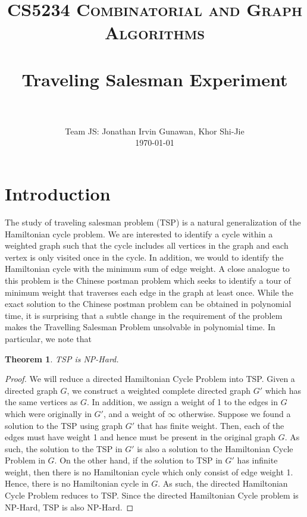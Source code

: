 \documentclass[paper=a4, fontsize=11pt]{scrartcl}	%
\title{
		\usefont{OT1}{bch}{b}{n}
		\normalfont \normalsize \textsc{CS5234 Combinatorial and Graph Algorithms} \\ [25pt]
		\horrule{0.5pt} \\[0.4cm]
		\huge Traveling Salesman Experiment \\
		\horrule{2pt} \\[0.5cm]
}
\author{
		\normalfont 								\normalsize
       Team JS: Jonathan Irvin Gunawan, Khor Shi-Jie\\[-3pt]		\normalsize
        \today
}
\date{}
\numberwithin{equation}{section}		%
\numberwithin{figure}{section}			%
\numberwithin{table}{section}				%
\newtheorem{theorem}{Theorem}
\begin{document}
\maketitle

\section{Introduction}
The study of traveling salesman problem (TSP) is a natural generalization of the Hamiltonian cycle problem. We are interested to identify a cycle within a weighted graph such that the cycle includes all vertices in the graph and each vertex is only visited once in the cycle. In addition, we would to identify the Hamiltonian cycle with the minimum sum of edge weight. A close analogue to this problem is the Chinese postman problem which seeks to identify a tour of minimum weight that traverses each edge in the graph at least once. While the exact solution to the Chinese postman problem can be obtained in polynomial time, it is surprising that a subtle change in the requirement of the problem makes the Travelling Salesman Problem unsolvable in polynomial time. In particular, we note that

\begin{theorem}
TSP is NP-Hard.
\end{theorem}

\begin{proof}
We will reduce a directed Hamiltonian Cycle Problem into TSP. Given a directed graph $G$, we construct a weighted complete directed graph $G'$ which has the same vertices as $G$. In addition, we assign a weight of 1 to the edges in $G$ which were originally in $G'$, and a weight of $\infty$ otherwise. Suppose we found a solution to the TSP using graph $G'$ that has finite weight. Then, each of the edges must have weight 1 and hence must be present in the original graph $G$. As such, the solution to the TSP in $G'$ is also a solution to the Hamiltonian Cycle Problem in $G$. On the other hand, if the solution to TSP in $G'$ has infinite weight, then there is no Hamiltonian cycle which only consist of edge weight 1. Hence, there is no Hamiltonian cycle in $G$. As such, the directed Hamiltonian Cycle Problem reduces to TSP. Since the directed Hamiltonian Cycle problem is NP-Hard, TSP is also NP-Hard.
\end{proof}
\end{document}
